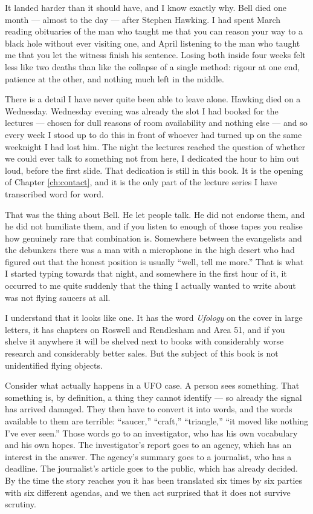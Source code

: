 It landed harder than it should have, and I know exactly why. Bell died one
month --- almost to the day --- after Stephen Hawking. I had spent March
reading obituaries of the man who taught me that you can reason your way to a
black hole without ever visiting one, and April listening to the man who taught
me that you let the witness finish his sentence. Losing both inside four weeks
felt less like two deaths than like the collapse of a single method: rigour at
one end, patience at the other, and nothing much left in the middle.

There is a detail I have never quite been able to leave alone. Hawking died on
a Wednesday. Wednesday evening was already the slot I had booked for the
lectures --- chosen for dull reasons of room availability
and nothing else --- and so every week I stood up to do this in front of
whoever had turned up on the same weeknight I had lost him. The night the
lectures reached the question of whether we could ever talk to something not
from here, I dedicated the hour to him out loud, before the first slide. That
dedication is still in this book. It is the opening of Chapter
\ref{ch:contact}, and it is the only part of the lecture series I have
transcribed word for word.

That was the thing about Bell. He let people talk. He did not endorse them, and
he did not humiliate them, and if you listen to enough of those tapes you
realise how genuinely rare that combination is. Somewhere between the
evangelists and the debunkers there was a man with a microphone in the high
desert who had figured out that the honest position is usually ``well, tell me
more.'' That is what I started typing towards that night, and somewhere in the
first hour of it, it occurred to me quite suddenly that the thing I actually
wanted to write about was not flying saucers at all.

 I understand that it looks like one. It has the
word \emph{Ufology} on the cover in large letters, it has chapters on Roswell
and Rendlesham and Area 51, and if you shelve it anywhere it will be shelved
next to books with considerably worse research and considerably better sales.
But the subject of this book is not unidentified flying objects.

Consider what actually happens in a UFO case. A person sees something. That
something is, by definition, a thing they cannot identify --- so already the
signal has arrived damaged. They then have to convert it into words, and the
words available to them are terrible: ``saucer,'' ``craft,'' ``triangle,''
``it moved like nothing I've ever seen.'' Those words go to an investigator,
who has his own vocabulary and his own hopes. The investigator's report goes to
an agency, which has an interest in the answer. The agency's summary goes to a
journalist, who has a deadline. The journalist's article goes to the public,
which has already decided. By the time the story reaches you it has been
translated six times by six parties with six different agendas, and we then act
surprised that it does not survive scrutiny.


